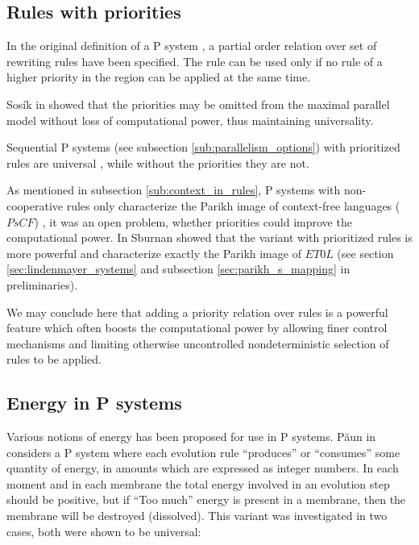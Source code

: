 
\subsection{Rules with priorities} %
\label{sub:rules_with_priorities}

In the original definition of a P system \cite{Paun98}, a partial order relation over set of rewriting rules have been specified. The rule can be used only if no rule of a higher priority in the region can be applied at the same time.

Sos\'ik in \cite{Sosik:2002:WithoutPriorities} showed that the priorities may be omitted from the maximal parallel model without loss of computational power, thus maintaining universality.

Sequential P systems (see subsection \ref{sub:parallelism_options}) with prioritized rules are universal \cite{Ibarra05Active}, while without the priorities they are not.

As mentioned in subsection \ref{sub:context_in_rules}, P systems with non-cooperative rules only characterize the Parikh image of context-free languages ($PsCF$) \cite{Sburlan05dragos}, it was an open problem, whether priorities could improve the computational power. In \cite{Sburlan05Priorities} Sburnan showed that the variant with prioritized rules is more powerful and characterize exactly the Parikh image of $ET0L$ (see section \ref{sec:lindenmayer_systems} and subsection \ref{sec:parikh_s_mapping} in preliminaries).

We may conclude here that adding a priority relation over rules is a powerful feature which often boosts the computational power by allowing finer control mechanisms and limiting otherwise uncontrolled nondeterministic selection of rules to be applied.


\subsection{Energy in P systems} %
\label{sub:energy_in_p_systems}

Various notions of energy has been proposed for use in P systems. P\u{a}un in \cite{Paun:2001:Energy} considers a P system where each evolution rule ``produces'' or ``consumes'' some quantity of energy, in amounts which are expressed as integer numbers. In each moment and in each membrane the total energy involved in an evolution step should be positive, but if ``Too much'' energy is present in a membrane, then the membrane will be destroyed (dissolved). This variant was investigated in two cases, both were shown to be universal:

